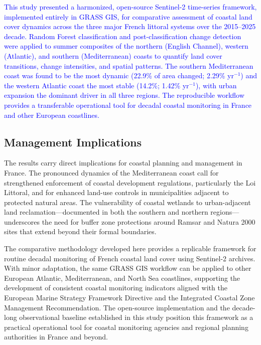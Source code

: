 \documentclass[coasts,article,submit,pdftex,moreauthors]{Definitions/mdpi}
\begin{document}
\textcolor{blue}{This study presented a harmonized, open-source Sentinel-2 time-series framework, implemented entirely in GRASS GIS, for comparative assessment of coastal land cover dynamics across the three major French littoral systems over the 2015--2025 decade. Random Forest classification and post-classification change detection were applied to summer composites of the northern (English Channel), western (Atlantic), and southern (Mediterranean) coasts to quantify land cover transitions, change intensities, and spatial patterns. The southern Mediterranean coast was found to be the most dynamic (22.9\% of area changed; 2.29\% yr$^{-1}$) and the western Atlantic coast the most stable (14.2\%; 1.42\% yr$^{-1}$), with urban expansion the dominant driver in all three regions. The reproducible workflow provides a transferable operational tool for decadal coastal monitoring in France and other European coastlines.}

\subsection{Management Implications}

The results carry direct implications for coastal planning and management in France. The pronounced dynamics of the Mediterranean coast call for strengthened enforcement of coastal development regulations, particularly the Loi Littoral, and for enhanced land-use controls in municipalities adjacent to protected natural areas. The vulnerability of coastal wetlands to urban-adjacent land reclamation—documented in both the southern and northern regions—underscores the need for buffer zone protections around Ramsar and Natura 2000 sites that extend beyond their formal boundaries.

The comparative methodology developed here provides a replicable framework for routine decadal monitoring of French coastal land cover using Sentinel-2 archives. With minor adaptation, the same GRASS GIS workflow can be applied to other European Atlantic, Mediterranean, and North Sea coastlines, supporting the development of consistent coastal monitoring indicators aligned with the European Marine Strategy Framework Directive and the Integrated Coastal Zone Management Recommendation. The open-source implementation and the decade-long observational baseline established in this study position this framework as a practical operational tool for coastal monitoring agencies and regional planning authorities in France and beyond.
\end{document}
